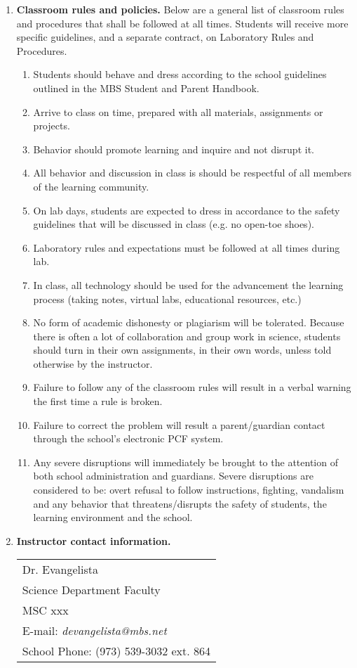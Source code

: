 \documentclass{article}
\begin{document}
\begin{enumerate}
\item \textbf{Classroom rules and policies.} Below are a general list of classroom rules and procedures that shall be followed at all times. Students will receive more specific guidelines, and a separate contract, on Laboratory Rules
and Procedures.
\begin{enumerate}
\item Students should behave and dress according to the school guidelines outlined in the MBS Student and Parent Handbook.
\item Arrive to class on time, prepared with all materials, assignments or projects.
\item Behavior should promote learning and inquire and not disrupt it.
\item All behavior and discussion in class is should be respectful of all members of the learning community.
\item On lab days, students are expected to dress in accordance to the safety guidelines that will be discussed in class (e.g. no open-toe shoes).
\item Laboratory rules and expectations must be followed at all times during lab.
\item In class, all technology should be used for the advancement the learning process (taking notes, virtual labs, educational resources, etc.)
\item No form of academic dishonesty or plagiarism will be tolerated. Because there is often a lot of collaboration and group work in science, students should turn in their own assignments, in their own words, unless told otherwise by the instructor.
\item Failure to follow any of the classroom rules will result in a verbal warning the first time a rule is broken.
\item Failure to correct the problem will result a parent/guardian contact through the school’s electronic PCF system. 
\item Any severe disruptions will immediately be brought to the attention of both school administration and guardians. Severe disruptions are considered to be: overt refusal to follow instructions, fighting, vandalism and any behavior that threatens/disrupts the safety of students, the learning environment and the school.
\end{enumerate}

\item \textbf{Instructor contact information.}
\begin{table}[h]
\hspace{3in}
\begin{tabular}{l}
Dr. Evangelista \\
Science Department Faculty \\
MSC xxx \\
E-mail: \emph{devangelista@mbs.net} \\ 
School Phone: (973) 539-3032 ext. 864 \\
\end{tabular}
\end{table}

\end{enumerate}

\nocite{fowler2017concepts}
\end{document}
